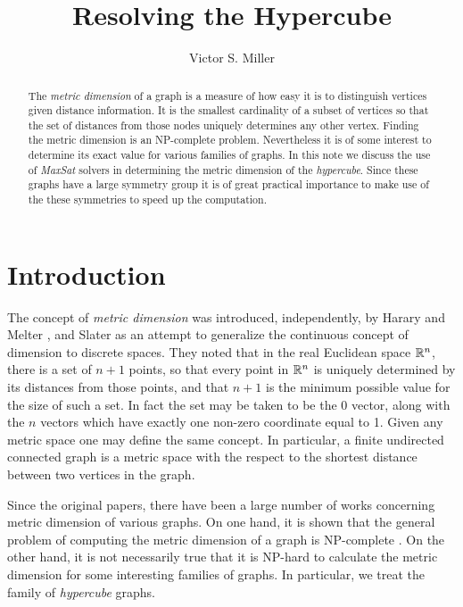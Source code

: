 \documentclass{article}
\title{Resolving the Hypercube} \author{Victor S. Miller}
\begin{document}
\maketitle
\begin{abstract}
  The \emph{metric dimension} of a graph is a measure of
  how easy it is to distinguish vertices given distance information.
  It is the smallest cardinality of a subset of vertices so that the set
  of distances from those nodes uniquely determines any other vertex.
  Finding the metric dimension is an NP-complete problem.
  Nevertheless it is of some interest to determine its exact value for
  various families of graphs.  In this note we discuss the use of
  \emph{MaxSat} solvers in determining the metric dimension of the
  \emph{hypercube}.  Since these graphs have a large symmetry group it
  is of great practical importance to make use of the these symmetries
  to speed up the computation.
\end{abstract}

\section{Introduction}
\label{sec:intro}

The concept of \emph{metric dimension} was introduced, independently,
by Harary and Melter \cite{harary1976metric}, and Slater
\cite{slater1975leaves} as an attempt to generalize the continuous
concept of dimension to discrete spaces.  They noted that in the real
Euclidean space $\mathbb{R}^n$, there is a set of $n+1$ points, so that
every point in $\mathbb{R}^n$ is uniquely determined by its distances from
those points, and that $n+1$ is the minimum possible value for the
size of such a set.  In fact the set may be taken to be the 0 vector,
along with the $n$ vectors which have exactly one non-zero coordinate
equal to 1.  Given any metric space one may define the same concept.
In particular, a finite undirected connected graph is a metric space
with the respect to the shortest distance between two vertices in the
graph.

Since the original papers, there have been a large number of works
concerning metric dimension of various graphs.  On one hand, it is
shown that the general problem of computing the metric dimension of a
graph is NP-complete
\cite[GT61]{garey1979computers,khuller1996landmarks,diaz2012complexity,hauptmann2012approximation}.
On the other hand, it is not necessarily true that it is NP-hard to
calculate the metric dimension for some interesting
families of graphs.  In particular, we treat the family of
\emph{hypercube} graphs.
\end{document}
